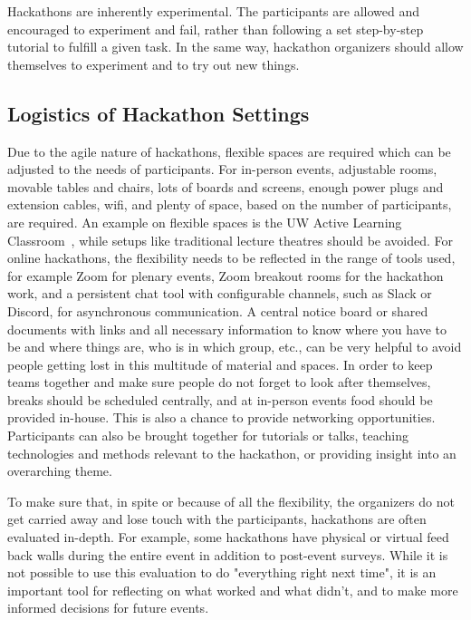 \documentclass{ieeeaccess}
\begin{document}
Hackathons are inherently experimental. 
The participants are allowed and encouraged to experiment and fail, rather than following a set step-by-step tutorial to fulfill a given task. 
In the same way, hackathon organizers should allow themselves to experiment and to try out new things.

\subsection{Logistics of Hackathon Settings}
Due to the agile nature of hackathons, flexible spaces are required which can be adjusted to the needs of participants. 
For in-person events, adjustable rooms, movable tables and chairs, lots of boards and screens, enough power plugs and extension cables, wifi, and plenty of space, based on the number of participants, are required. 
An example on flexible spaces is the UW Active Learning Classroom~\cite{UW}, while setups like traditional lecture theatres should be avoided.
For online hackathons, the flexibility needs to be reflected in the range of tools used, for example Zoom for plenary events, Zoom breakout rooms for the hackathon work, and a persistent chat tool with configurable channels, such as Slack or Discord, for asynchronous communication. 
A central notice board or shared documents with links and all necessary information to know where you have to be and where things are, who is in which group, etc., can be very helpful to avoid people getting lost in this multitude of material and spaces. 
In order to keep teams together and make sure people do not forget to look after themselves, breaks should be scheduled centrally, and at in-person events food should be provided in-house. 
This is also a chance to provide networking opportunities. 
Participants can also be brought together for tutorials or talks, teaching technologies and methods relevant to the hackathon, or providing insight into an overarching theme.

To make sure that, in spite or because of all the flexibility, the organizers do not get carried away and lose touch with the participants, hackathons are often evaluated in-depth.
For example, some hackathons have physical or virtual feed back walls during the entire event in addition to post-event surveys. 
While it is not possible to use this evaluation to do "everything right next time", it is an important tool for reflecting on what worked and what didn't, and to make more informed decisions for future events.
    
\end{document}
